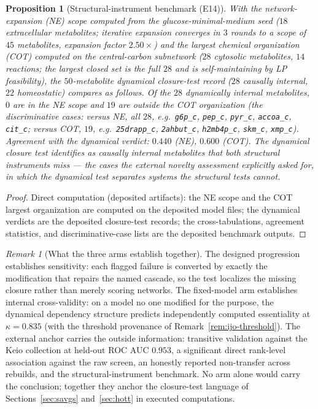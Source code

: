 \documentclass[11pt,a4paper]{article}
\theoremstyle{plain}
\newtheorem{proposition}[theorem]{Proposition}
\theoremstyle{definition}
\theoremstyle{remark}
\newtheorem{remark}[theorem]{Remark}
\begin{document}
\begin{proposition}[Structural-instrument benchmark (E14)]
\label{prop:e14-structural}
With the network-expansion (NE) scope computed from the
glucose-minimal-medium seed ($18$ extracellular metabolites;
iterative expansion converges in $3$ rounds to a scope of $45$
metabolites, expansion factor $2.50\times$) and the largest
chemical organization (COT) computed on the central-carbon
subnetwork ($28$ cytosolic metabolites, $14$ reactions; the
largest closed set is the full $28$ and is self-maintaining by LP
feasibility), the $50$-metabolite dynamical closure-test record
($28$ causally internal, $22$ homeostatic) compares as follows.
Of the $28$ dynamically internal metabolites, $0$ are in the NE
scope and $19$ are outside the COT organization (the discriminative
cases: versus NE, all $28$, e.g.\ \texttt{g6p\_c},
\texttt{pep\_c}, \texttt{pyr\_c}, \texttt{accoa\_c},
\texttt{cit\_c}; versus COT, $19$, e.g.\ \texttt{25drapp\_c},
\texttt{2ahbut\_c}, \texttt{h2mb4p\_c}, \texttt{skm\_c},
\texttt{xmp\_c}). Agreement with the dynamical verdict: $0.440$
(NE), $0.600$ (COT). The dynamical closure test identifies as
causally internal metabolites that both structural instruments
miss --- the cases the external novelty assessment explicitly
asked for, in which the dynamical test separates systems the
structural tests cannot.
\end{proposition}

\begin{proof}
Direct computation (deposited artifacts): the NE scope and the COT
largest organization are computed on the deposited model files;
the dynamical verdicts are the deposited closure-test records; the
cross-tabulations, agreement statistics, and discriminative-case
lists are the deposited benchmark outputs.
\end{proof}

\begin{remark}[What the three arms establish together]
\label{rem:network-battery-reading}
The designed progression establishes sensitivity: each flagged
failure is converted by exactly the modification that repairs the
named cascade, so the test localizes the missing closure rather
than merely scoring networks. The fixed-model arm establishes
internal cross-validity: on a model no one modified for the
purpose, the dynamical dependency structure predicts independently
computed essentiality at $\kappa=0.835$ (with the threshold
provenance of Remark~\ref{rem:ijo-threshold}). The external anchor
carries the outside information: transitive validation against the
Keio collection at held-out ROC AUC $0.953$, a significant direct
rank-level association against the raw screen, an honestly
reported non-transfer across rebuilds, and the structural-instrument
benchmark. No arm alone would carry the conclusion; together they
anchor the closure-test language of
Sections~\ref{sec:savgs} and~\ref{sec:hott} in executed
computations.
\end{remark}
\end{document}
